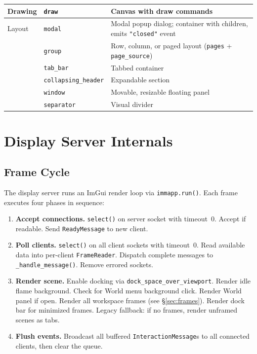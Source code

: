 \documentclass[a4paper,10pt]{article}
\newcommand{\msg}[1]{\texttt{#1}}
\newcommand{\elem}[1]{\texttt{#1}}
\newcommand{\field}[1]{\texttt{#1}}
\begin{document}
\begin{center}
\begin{longtable}{llp{6cm}}
\midrule
Drawing     & \elem{draw}              & Canvas with draw commands \\
\midrule
Layout      & \elem{modal}             & Modal popup dialog; container with children,
              emits \texttt{"closed"} event \\
            & \elem{group}             & Row, column, or paged layout
              (\field{pages} + \field{page\_source}) \\
            & \elem{tab\_bar}          & Tabbed container \\
            & \elem{collapsing\_header} & Expandable section \\
            & \elem{window}            & Movable, resizable floating panel \\
            & \elem{separator}         & Visual divider \\
\bottomrule
\end{longtable}
\end{center}

\section{Display Server Internals}

\subsection{Frame Cycle}

The display server runs an ImGui render loop via \texttt{immapp.run()}.
Each frame executes four phases in sequence:

\begin{enumerate}
  \item \textbf{Accept connections.}  \texttt{select()} on server
    socket with timeout~0.  Accept if readable.  Send
    \msg{ReadyMessage} to new client.
  \item \textbf{Poll clients.}  \texttt{select()} on all client
    sockets with timeout~0.  Read available data into per-client
    \texttt{FrameReader}.  Dispatch complete messages to
    \texttt{\_handle\_message()}.  Remove errored sockets.
  \item \textbf{Render scene.}  Enable docking via
    \texttt{dock\_space\_over\_viewport}.  Render idle flame background.
    Check for World menu background click.  Render World panel if open.
    Render all workspace frames (see \S\ref{sec:frames}).  Render dock
    bar for minimized frames.  Legacy fallback: if no frames, render
    unframed scenes as tabs.
  \item \textbf{Flush events.}  Broadcast all buffered
    \msg{InteractionMessage}s to all connected clients, then clear
    the queue.
\end{enumerate}
\end{document}
